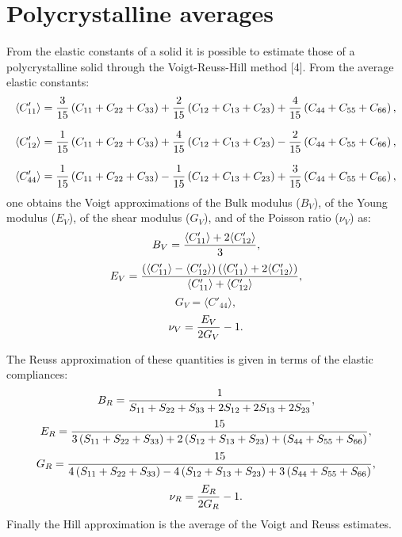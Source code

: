 \documentclass[12pt,a4paper,twoside]{report}
\begin{document}
{\color{dark-blue}\chapter{Polycrystalline averages}}
\color{black}
From the elastic constants of a solid it is possible to estimate those
of a polycrystalline solid through the Voigt-Reuss-Hill method [4].
From the average elastic constants:
\begin{equation}
\langle C'_{11} \rangle = {3 \over 15} \left(C_{11} + C_{22} +C_{33}\right)
+{2 \over 15} \left(C_{12} + C_{13} +C_{23}\right) 
+{4 \over 15} \left(C_{44} + C_{55} +C_{66}\right),
\end{equation}

\begin{equation}
\langle C'_{12} \rangle = {1 \over 15} \left(C_{11} + C_{22} +C_{33}\right)
+{4 \over 15} \left(C_{12} + C_{13} +C_{23}\right) 
-{2 \over 15} \left(C_{44} + C_{55} +C_{66}\right),
\end{equation}

\begin{equation}
\langle C'_{44} \rangle = {1 \over 15} \left(C_{11} + C_{22} +C_{33}\right)
-{1 \over 15} \left(C_{12} + C_{13} +C_{23}\right) 
+{3 \over 15} \left(C_{44} + C_{55} +C_{66}\right),
\end{equation}
one obtains the Voigt approximations of the Bulk modulus
($B_V$), of the Young modulus ($E_V$), of the shear modulus ($G_V$), and of 
the Poisson ratio ($\nu_V$) as:
\begin{equation}
B_V = { \langle C'_{11} \rangle + 2 \langle C'_{12} \rangle \over 3},
\end{equation}
\begin{equation}
E_V = {\left(\langle C'_{11} \rangle - \langle C'_{12} \rangle \right)
\left( \langle C'_{11} \rangle + 2 \langle C'_{12} \rangle \right) \over 
\langle C'_{11} \rangle + \langle C'_{12} \rangle },
\end{equation}
\begin{equation}
G_V = \langle C'_{44} \rangle,
\end{equation}
\begin{equation}
\nu_V = {E_V \over 2 G_V} - 1. 
\end{equation}

The Reuss approximation of these quantities is given in terms of the elastic
compliances:
\begin{equation}
B_R = {1 \over  S_{11} + S_{22} + S_{33} + 2 S_{12} + 2 S_{13} + 2 S_{23} },
\end{equation}
\begin{equation}
E_R = {15 \over 3 \left(S_{11} + S_{22} +S_{33}\right)
+2 \left(S_{12} + S_{13} +S_{23}\right) 
+\left(S_{44} + S_{55} +S_{66}\right) },
\end{equation}
\begin{equation}
G_R = {15 \over 4 \left(S_{11} + S_{22} +S_{33}\right)
-4 \left(S_{12} + S_{13} +S_{23}\right) 
+ 3 \left(S_{44} + S_{55} +S_{66}\right) },
\end{equation}
\begin{equation}
\nu_R = {E_R \over 2 G_R} - 1.
\end{equation}
Finally the Hill approximation is the average of the Voigt and Reuss
estimates.
\end{document}
